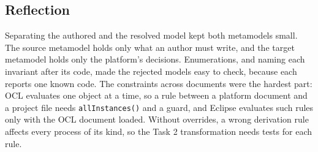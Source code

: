 \subsection{Reflection}

Separating the authored and the resolved model kept both metamodels small. The
source metamodel holds only what an author must write, and the target metamodel
holds only the platform's decisions. Enumerations, and naming each invariant
after its code, made the rejected models easy to check, because each reports one
known code. The constraints across documents were the hardest part: OCL
evaluates one object at a time, so a rule between a platform document and a
project file needs \texttt{allInstances()} and a guard, and Eclipse evaluates
such rules only with the OCL document loaded. Without overrides, a wrong
derivation rule affects every process of its kind, so the Task 2 transformation
needs tests for each rule.
